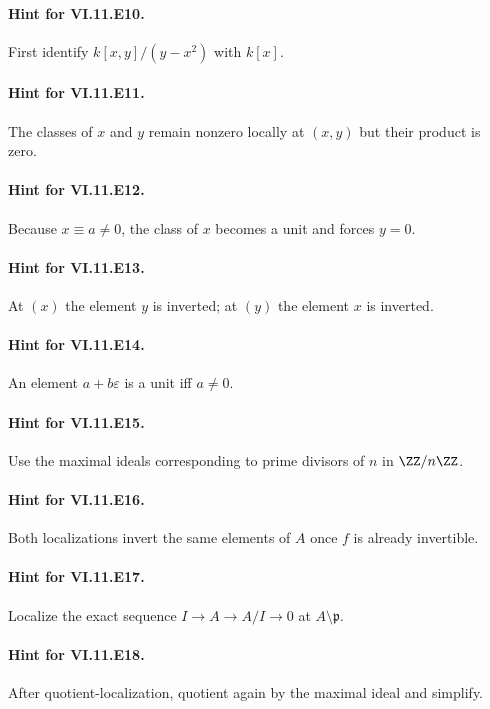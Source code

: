 \paragraph{Hint for VI.11.E10.} First identify $k[x,y]/(y-x^2)$ with $k[x]$.

\paragraph{Hint for VI.11.E11.} The classes of $x$ and $y$ remain nonzero locally at $(x,y)$ but their product is zero.

\paragraph{Hint for VI.11.E12.} Because $x\equiv a\neq0$, the class of $x$ becomes a unit and forces $y=0$.

\paragraph{Hint for VI.11.E13.} At $(x)$ the element $y$ is inverted; at $(y)$ the element $x$ is inverted.

\paragraph{Hint for VI.11.E14.} An element $a+b\varepsilon$ is a unit iff $a\neq0$.

\paragraph{Hint for VI.11.E15.} Use the maximal ideals corresponding to prime divisors of $n$ in $\ZZ/n\ZZ$.

\paragraph{Hint for VI.11.E16.} Both localizations invert the same elements of $A$ once $f$ is already invertible.

\paragraph{Hint for VI.11.E17.} Localize the exact sequence $I\to A\to A/I\to0$ at $A\setminus\mathfrak p$.

\paragraph{Hint for VI.11.E18.} After quotient-localization, quotient again by the maximal ideal and simplify.

